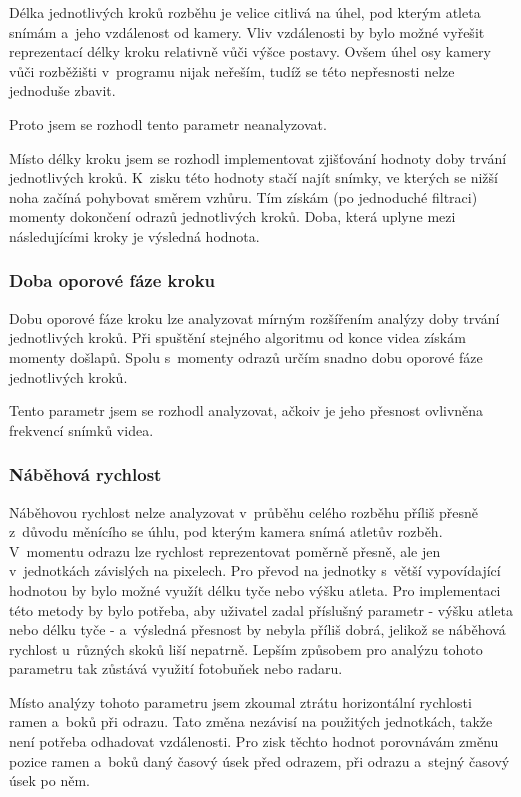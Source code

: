 Délka jednotlivých kroků rozběhu je velice citlivá na úhel, pod kterým atleta snímám a~jeho vzdálenost od kamery. Vliv vzdálenosti by bylo možné vyřešit reprezentací délky kroku relativně vůči výšce postavy. Ovšem úhel osy kamery vůči rozběžišti v~programu nijak neřeším, tudíž se této nepřesnosti nelze jednoduše zbavit.

Proto jsem se rozhodl tento parametr neanalyzovat.

Místo délky kroku jsem se rozhodl implementovat zjišťování hodnoty doby trvání jednotlivých kroků. K~zisku této hodnoty stačí najít snímky, ve kterých se nižší noha začíná pohybovat směrem vzhůru. Tím získám (po jednoduché filtraci) momenty dokončení odrazů jednotlivých kroků. Doba, která uplyne mezi následujícími kroky je výsledná hodnota.


\subsubsection{Doba oporové fáze kroku}

Dobu oporové fáze kroku lze analyzovat mírným rozšířením analýzy doby trvání jednotlivých kroků. Při spuštění stejného algoritmu od konce videa získám momenty došlapů. Spolu s~momenty odrazů určím snadno dobu oporové fáze jednotlivých kroků.

Tento parametr jsem se rozhodl analyzovat, ačkoiv je jeho přesnost ovlivněna frekvencí snímků videa.


\subsubsection{Náběhová rychlost}

Náběhovou rychlost nelze analyzovat v~průběhu celého rozběhu příliš přesně z~důvodu měnícího se úhlu, pod kterým kamera snímá atletův rozběh. V~momentu odrazu lze rychlost reprezentovat poměrně přesně, ale jen v~jednotkách závislých na pixelech. Pro převod na jednotky s~větší vypovídající hodnotou by bylo možné využít délku tyče nebo výšku atleta. Pro implementaci této metody by bylo potřeba, aby uživatel zadal příslušný parametr - výšku atleta nebo délku tyče - a~výsledná přesnost by nebyla příliš dobrá, jelikož se náběhová rychlost u~různých skoků liší nepatrně. Lepším způsobem pro analýzu tohoto parametru tak zůstává využití fotobuňek nebo radaru.

Místo analýzy tohoto parametru jsem zkoumal ztrátu horizontální rychlosti ramen a~boků při odrazu. Tato změna nezávisí na použitých jednotkách, takže není potřeba odhadovat vzdálenosti. Pro zisk těchto hodnot porovnávám změnu pozice ramen a~boků daný časový úsek před odrazem, při odrazu a~stejný časový úsek po něm.


